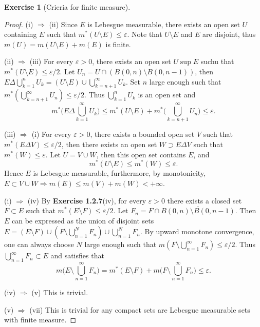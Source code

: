 \documentclass[a4paper]{article}
\newtheorem{ex}{Exercise}[subsection]
\begin{document}
\begin{ex}[Crieria for finite measure]\end{ex}
\begin{proof}
(i) $\Rightarrow$ (ii) Since $E$ is Lebesgue measurable, there exists an open set $U$ containing $E$ such that
$m^*(U \setminus E) \leq  \varepsilon$. Note that $U \setminus E$ and $E$ are disjoint, thus 
$m(U) = m(U \setminus E) + m(E)$ is finite.

(ii) $\Rightarrow$ (iii) For every $\varepsilon > 0$, there exists an open set $U \sup E$ suchu that 
$m^*(U \setminus E) \leq \varepsilon / 2$. Let $U_n = U \cap (B(0, n) \setminus B(0, n - 1))$, then 
$E \Delta \bigcup_{k = 1}^n U_k = (U \setminus E) \cup \bigcup_{k = n + 1}^\infty U_k$. Set $n$ large enough such that 
$m^*(\bigcup_{k = n + 1}^\infty U_n) \leq \varepsilon / 2$.  Thus $\bigcup_{k = 1}^n U_k$ is an open set and$$
m^*\Big(E \Delta \bigcup_{k = 1}^\infty U_k \Big) \leq m^*(U \setminus E) + m^*\Big(\bigcup_{k = n + 1}^\infty U_n\Big) 
\leq \varepsilon.
$$

(iii) $\Rightarrow$ (i) For every $\varepsilon > 0$, there exists a bounded open set $V$ such that 
$m^*(E \Delta V) \leq \varepsilon / 2$, then there exists an open set $W \supset E \Delta V$ such that 
$m^*(W) \leq \varepsilon$. Let $U = V \cup W$, then this open set contains $E$, and $$
m^*(U \setminus E) \leq m^*(W) \leq \varepsilon.
$$Hence $E$ is Lebesgue measurable, furthermore, by monotonicity, 
$E \subset V \cup W \Rightarrow m(E) \leq m(V) + m(W) < +\infty$.

(i) $\Rightarrow$ (iv) By {\bfseries Exercise 1.2.7}(iv), for every $\varepsilon > 0$ there exists a closed set
$F \subset E$ such that $m^*(E \setminus F) \leq \varepsilon /2$. Let $F_n = F \cap \overline{B(0, n) \setminus B(0, n - 1)}$.
Then $E$ can be expressed as the union of disjoint sets 
$E = (E \setminus F) \cup (F \setminus \bigcup_{n = 1}^N F_n) \cup \bigcup_{n = 1}^N F_n$. By upward monotone convergence,
one can always choose $N$ large enough such that $m(F \setminus \bigcup_{n = 1}^\infty F_n) \leq \varepsilon / 2$.
Thus $\bigcup_{n = 1}^\infty F_n \subset E$ and satisfies that $$
m\Big(E \setminus \bigcup_{n = 1}^\infty F_n\Big) = m^*(E \setminus F) + m\Big(F \setminus \bigcup_{n = 1}^\infty F_n\Big)
\leq \varepsilon.
$$

(iv) $\Rightarrow$ (v) This is trivial.

(v) $\Rightarrow$ (vii) This is trivial for any compact sets are Lebesgue measurable sets with finite measure.


\end{proof}
\end{document}

